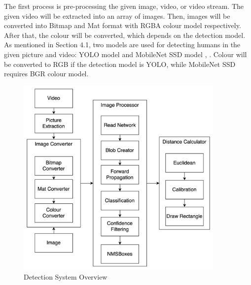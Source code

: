         The first process is pre-processing the given image, video, or video stream.
        The given video will be extracted into an array of images.
        Then, images will be converted into Bitmap and Mat format with RGBA colour model respectively.
        After that, the colour will be converted, which depends on the detection model.
        As mentioned in Section 4.1, two models are used for detecting humans in the given picture and video: YOLO model and MobileNet SSD model \cite{tensorflow2015-whitepaper}, \cite{YOLO-v3}.
        Colour will be converted to RGB if the detection model is YOLO,
        while MobileNet SSD requires BGR colour model.

        \begin{figure}[!ht]
            \centering
            \includegraphics[width=4in]{images/chapter3/system-overview.png}
            \caption{Detection System Overview}
            \label{systemOverview}
        \end{figure}

